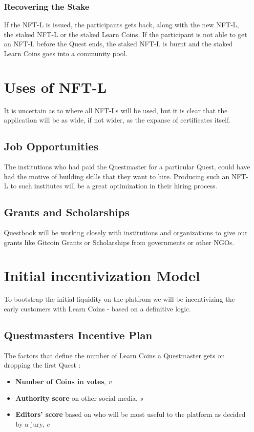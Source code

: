 \documentclass{article}
\begin{document}
        \subsubsection{Recovering the Stake}
          If the NFT-L is issued, the participants gets back, along with the new NFT-L, the staked NFT-L or the staked Learn Coins.
          \break
          If the participant is not able to get an NFT-L before the Quest ends, the staked NFT-L is burnt and the staked Learn Coins goes into a community pool.
  \section{Uses of NFT-L}
    It is uncertain as to where all NFT-Ls will be used, but it is clear that the application will be as wide, if not wider, as the expanse of certificates itself.
    \subsection{Job Opportunities}
      The institutions who had paid the Questmaster for a particular Quest, could have had the motive of building skills that they want to hire. Producing such an NFT-L to such institutes will be a great optimization in their hiring process.
    \subsection{Grants and Scholarships}
      Questbook will be working closely with institutions and organizations to give out grants like Gitcoin Grants or Scholarships from governments or other NGOs.
  \section{Initial incentivization Model}
    To bootstrap the initial liquidity on the platfrom we will be incentivizing the early customers with Learn Coins - based on a definitive logic.
    \subsection{Questmasters Incentive Plan}
      The factors that define the number of Learn Coins a Questmaster gets on dropping the first Quest :
      \begin{itemize}
        \item \textbf{Number of Coins in votes}, \textit{v}
        \item \textbf{Authority score} on other social media, \textit{s}
        \item \textbf{Editors' score} based on who will be most useful to the platform as decided by a jury, \textit{e}
      \end{itemize} 
\end{document}
